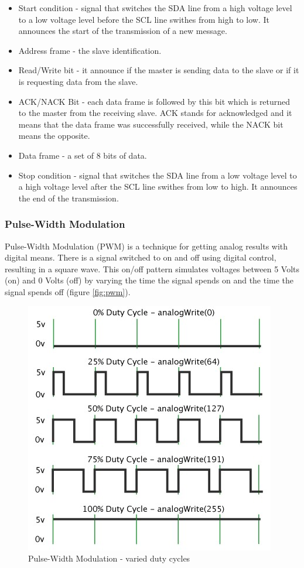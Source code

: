 \documentclass[runningheads,a4paper,12pt]{report}
\begin{document}
\begin{itemize}
\item Start condition - signal that switches the SDA line from a high voltage level to a low voltage level before the SCL line swithes from high to low. It announces the start of the transmission of a new message.
\item Address frame - the slave identification.
\item Read/Write bit - it announce if the master is sending data to the slave or if it is requesting data from the slave.
\item ACK/NACK Bit - each data frame is followed by this bit which is returned to the master from the receiving slave. ACK stands for acknowledged and it means that the data frame was successfully received, while the NACK bit means the opposite.  
\item Data frame - a set of 8 bits of data.
\item Stop condition - signal that switches the SDA line from a low voltage level to a high voltage level after the SCL line swithes from low to high. It announces the end of the transmission.
\end{itemize}

\subsubsection{Pulse-Width Modulation}
\label{section:pwm}
Pulse-Width Modulation (PWM) is a technique for getting analog results with digital means. There is a signal switched to on and off using digital control, resulting in a square wave. This on/off pattern simulates voltages between 5 Volts (on) and 0 Volts (off) by varying the time the signal spends on and the time the signal spends off (figure \ref{fig:pwm}).  

\begin{figure}[h]
	\centering

  	\includegraphics[width=.6\linewidth]{./images/1_pwm}\hfill

    \caption{Pulse-Width Modulation - varied duty cycles}  
    \label{fig:i2c}
\end{figure}
\end{document}
